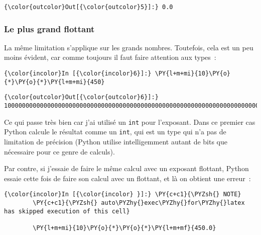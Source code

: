 \begin{Verbatim}[commandchars=\\\{\}]
{\color{outcolor}Out[{\color{outcolor}5}]:} 0.0
\end{Verbatim}
            
    \hypertarget{le-plus-grand-flottant}{%
\subsubsection{Le plus grand flottant}\label{le-plus-grand-flottant}}

    La même limitation s'applique sur les grands nombres. Toutefois, cela
est un peu moins évident, car comme toujours il faut faire attention aux
types~:

    \begin{Verbatim}[commandchars=\\\{\}]
{\color{incolor}In [{\color{incolor}6}]:} \PY{l+m+mi}{10}\PY{o}{*}\PY{o}{*}\PY{l+m+mi}{450}
\end{Verbatim}


\begin{Verbatim}[commandchars=\\\{\}]
{\color{outcolor}Out[{\color{outcolor}6}]:} 1000000000000000000000000000000000000000000000000000000000000000000000000000000000000000000000000000000000000000000000000000000000000000000000000000000000000000000000000000000000000000000000000000000000000000000000000000000000000000000000000000000000000000000000000000000000000000000000000000000000000000000000000000000000000000000000000000000000000000000000000000000000000000000000000000000000000000000000000000000000000000000000000000000000000000000
\end{Verbatim}
            
    Ce qui passe très bien car j'ai utilisé un \texttt{int} pour l'exposant.
Dans ce premier cas Python calcule le résultat comme un \texttt{int},
qui est un type qui n'a pas de limitation de précision (Python utilise
intelligemment autant de bits que nécessaire pour ce genre de calculs).

Par contre, si j'essaie de faire le même calcul avec un exposant
flottant, Python essaie cette fois de faire son calcul avec un flottant,
et là on obtient une erreur~:

    \begin{Verbatim}[commandchars=\\\{\}]
{\color{incolor}In [{\color{incolor} }]:} \PY{c+c1}{\PYZsh{} NOTE}
        \PY{c+c1}{\PYZsh{} auto\PYZhy{}exec\PYZhy{}for\PYZhy{}latex has skipped execution of this cell}
        
        \PY{l+m+mi}{10}\PY{o}{*}\PY{o}{*}\PY{l+m+mf}{450.0}
\end{Verbatim}


